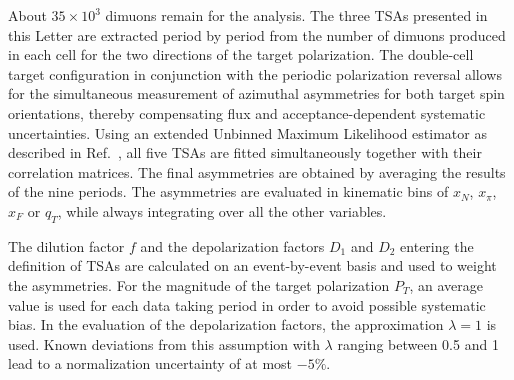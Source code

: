 \documentclass[a4paper,manyauthors,nocleardouble,COMPASS]{cernphprep}
\newcommand{\gvc}{GeV/$c$}
\newcommand{\red}{\textcolor[rgb]{1.00,0.00,0.00}}
\begin{document}
%
%
%
%



%
%
%

About $35\times10^3$ dimuons remain for the analysis.
The three TSAs presented in this Letter are extracted period by period from the number of dimuons produced in each cell for the two directions of the target polarization.
The double-cell target configuration in conjunction with the periodic polarization reversal allows for the simultaneous measurement of azimuthal asymmetries for both target spin orientations, thereby compensating flux and acceptance-dependent systematic uncertainties.
%
Using an extended Unbinned Maximum Likelihood estimator as described in Ref.~\cite{Adolph:2012nw}, all five TSAs are fitted simultaneously together with their correlation matrices.
The final asymmetries are obtained by averaging the results of the nine periods.
The asymmetries are evaluated in kinematic bins of $x_{N}$, $x_{\pi}$, $x_{F}$ or $q_{T}$, while always integrating over
all the other variables.


The dilution factor $f$ and the depolarization factors $D_{1}$ and $D_{2}$ entering the definition of TSAs are calculated on an event-by-event basis and used to weight the asymmetries. For the magnitude of the target polarization $P_T$, an average value is used for each data taking period in order to avoid possible systematic bias. In the evaluation of the depolarization factors, the approximation $\lambda=1$ is used. Known deviations from this assumption with $\lambda$ ranging between 0.5 and 1~\cite{Guanziroli:1987rp,Conway:1989fs} lead to a normalization uncertainty of at most $-5\%$.
\end{document}
